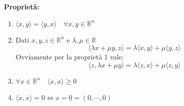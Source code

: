 \textbf{Proprietà:}
\begin{enumerate}
	\item $\langle x, y \rangle = \langle y, x \rangle \quad \forall x, y \in \mathbb{R}^n$

	\item Dati $x, y, z \in \mathbb{R}^n$ e $\lambda, \mu \in \mathbb{R}$ 
		\begin{equation*}
			\langle \lambda x + \mu y, z \rangle = \lambda \langle x, y \rangle + \mu \langle y, z \rangle
		\end{equation*}
		Ovviamente per la proprietà 1 vale:
		\begin{equation*}
			\langle z, \lambda x + \mu y \rangle = \lambda \langle z, x \rangle + \mu \langle z, y \rangle
		\end{equation*}

	\item $\forall x \in \mathbb{R}^n \quad \langle x, x \rangle \geq 0$
	
	\item $\langle x, x \rangle = 0 \iff x = \underline{0} = (0, \cdots, 0)$
\end{enumerate}

